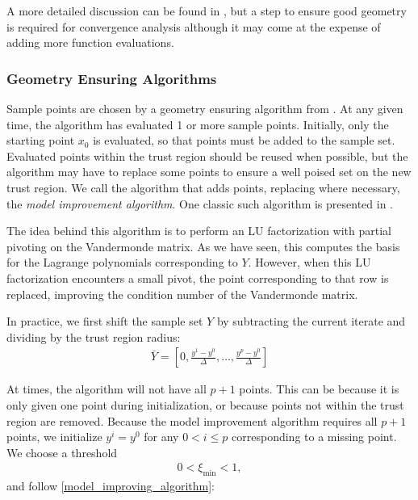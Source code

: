 \documentclass{article}
\theoremstyle{case}
\numberwithin{theorem}{subsection}
\newcommand{\ximin}{\xi_{\text{min}}}
\begin{document}
A more detailed discussion can be found in \cite{doi:10.1080/10556780802409296}, but a step to ensure good geometry is required for convergence analysis although it may come at the expense of adding more function evaluations.

\subsubsection{Geometry Ensuring Algorithms}

Sample points are chosen by a geometry ensuring algorithm from \cite{introduction_book}.
At any given time, the algorithm has evaluated 1 or more sample points.
Initially, only the starting point $x_0$ is evaluated, so that points must be added to the sample set.
Evaluated points within the trust region should be reused when possible, but the algorithm may have to replace some points to ensure a well poised set on the new trust region.
We call the algorithm that adds points, replacing where necessary, the \emph{model improvement algorithm}.
One classic such algorithm is presented in \cite{introduction_book}.

The idea behind this algorithm is to perform an LU factorization with partial pivoting on the Vandermonde matrix.
As we have seen, this computes the basis for the Lagrange polynomials corresponding to $Y$.
However, when this LU factorization encounters a small pivot, the point corresponding to that row is replaced, improving the condition number of the Vandermonde matrix.

In practice, we first shift the sample set $Y$ by subtracting the current iterate and dividing by the trust region radius:
\begin{align}
\bar{Y} = [0, \frac{y^1 - y^0}{\Delta}, \ldots, \frac{y^p - y^0}{\Delta}]
\end{align}

At times, the algorithm will not have all $p+1$ points.
This can be because it is only given one point during initialization, or because points not within the trust region are removed.
Because the model improvement algorithm requires all $p+1$ points, we initialize $y^i = y^0$ for any $0 < i \le p$ corresponding to a missing point.
We choose a threshold 
\begin{align}
0 < \ximin < 1 \label{define_ximin},
\end{align} and follow \cref{model_improving_algorithm}:
\end{document}

